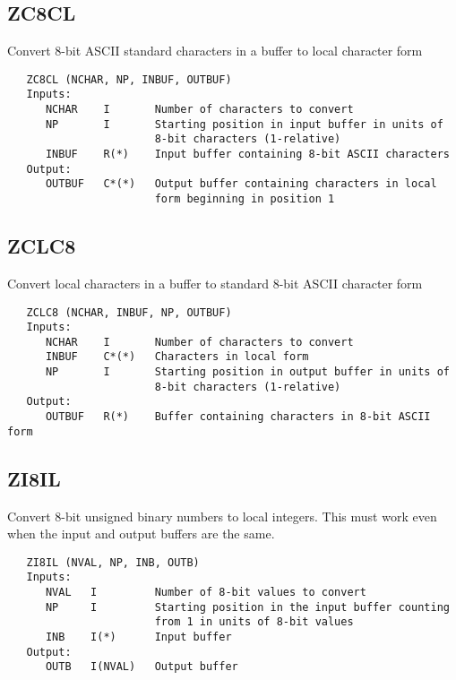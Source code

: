\subsection{ZC8CL}
Convert 8-bit ASCII standard characters in a buffer to local
character form
\begin{verbatim}
   ZC8CL (NCHAR, NP, INBUF, OUTBUF)
   Inputs:
      NCHAR    I       Number of characters to convert
      NP       I       Starting position in input buffer in units of
                       8-bit characters (1-relative)
      INBUF    R(*)    Input buffer containing 8-bit ASCII characters
   Output:
      OUTBUF   C*(*)   Output buffer containing characters in local
                       form beginning in position 1

\end{verbatim}

\subsection{ZCLC8}
Convert local characters in a buffer to standard 8-bit ASCII
character form
\begin{verbatim}
   ZCLC8 (NCHAR, INBUF, NP, OUTBUF)
   Inputs:
      NCHAR    I       Number of characters to convert
      INBUF    C*(*)   Characters in local form
      NP       I       Starting position in output buffer in units of
                       8-bit characters (1-relative)
   Output:
      OUTBUF   R(*)    Buffer containing characters in 8-bit ASCII form

\end{verbatim}

\subsection{ZI8IL}
Convert 8-bit unsigned binary numbers to local integers.  This must
work even when the input and output buffers are the same.
\begin{verbatim}
   ZI8IL (NVAL, NP, INB, OUTB)
   Inputs:
      NVAL   I         Number of 8-bit values to convert
      NP     I         Starting position in the input buffer counting
                       from 1 in units of 8-bit values
      INB    I(*)      Input buffer
   Output:
      OUTB   I(NVAL)   Output buffer

\end{verbatim}

